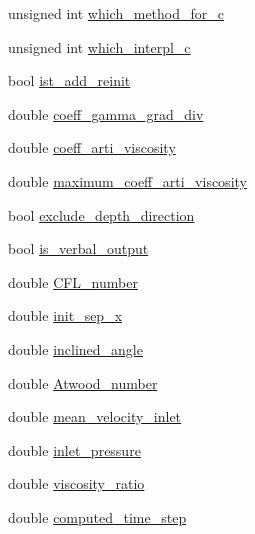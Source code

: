 \begin{DoxyCompactItemize}
unsigned int \hyperlink{struct_u_b_c__mis__mixing_1_1_parameters_a81d4347712206d82a814748c69c2403a}{which\+\_\+method\+\_\+for\+\_\+c}
\item 
unsigned int \hyperlink{struct_u_b_c__mis__mixing_1_1_parameters_a01aafac2f16cff86d97c56971b556863}{which\+\_\+interpl\+\_\+c}
\item 
bool \hyperlink{struct_u_b_c__mis__mixing_1_1_parameters_a30c8c6eae5b3ba5970a52a4a2ca830ee}{ist\+\_\+add\+\_\+reinit}
\item 
double \hyperlink{struct_u_b_c__mis__mixing_1_1_parameters_a7fc00c11e3b0133cfd11fd066bf001b1}{coeff\+\_\+gamma\+\_\+grad\+\_\+div}
\item 
double \hyperlink{struct_u_b_c__mis__mixing_1_1_parameters_a349983dede465f524f0fe30f407cc1f9}{coeff\+\_\+arti\+\_\+viscosity}
\item 
double \hyperlink{struct_u_b_c__mis__mixing_1_1_parameters_aab1eefbfc10c6c2fbf6e17c0052e1e66}{maximum\+\_\+coeff\+\_\+arti\+\_\+viscosity}
\item 
bool \hyperlink{struct_u_b_c__mis__mixing_1_1_parameters_ae346c5f4dda04f8404da70094270f079}{exclude\+\_\+depth\+\_\+direction}
\item 
bool \hyperlink{struct_u_b_c__mis__mixing_1_1_parameters_ac75a0e2ec5561c641dbd46734330107a}{is\+\_\+verbal\+\_\+output}
\item 
double \hyperlink{struct_u_b_c__mis__mixing_1_1_parameters_ad34f1ebb7a819cabba044cae1af0b20d}{C\+F\+L\+\_\+number}
\item 
double \hyperlink{struct_u_b_c__mis__mixing_1_1_parameters_a943bbda36648d70b9538e331df84806e}{init\+\_\+sep\+\_\+x}
\item 
double \hyperlink{struct_u_b_c__mis__mixing_1_1_parameters_af85cef2fb611aff3bd93861f3dcedddd}{inclined\+\_\+angle}
\item 
double \hyperlink{struct_u_b_c__mis__mixing_1_1_parameters_a5d8b3abc5e87d4fb4e1f4df33f139670}{Atwood\+\_\+number}
\item 
double \hyperlink{struct_u_b_c__mis__mixing_1_1_parameters_a4e2da6f12751c597845f9ec3d3c124c2}{mean\+\_\+velocity\+\_\+inlet}
\item 
double \hyperlink{struct_u_b_c__mis__mixing_1_1_parameters_a82c51f961f3b029147cf4658e747096c}{inlet\+\_\+pressure}
\item 
double \hyperlink{struct_u_b_c__mis__mixing_1_1_parameters_a5247eabbe538c57069f6deefa55ac4d0}{viscosity\+\_\+ratio}
\item 
double \hyperlink{struct_u_b_c__mis__mixing_1_1_parameters_adc26ebcb3c943eaedd706e544895c178}{computed\+\_\+time\+\_\+step}

\end{DoxyCompactItemize}

